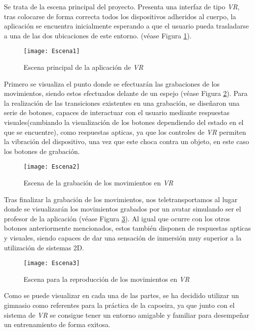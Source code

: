 Se trata de la escena principal del proyecto. Presenta una interfaz de tipo \textit{VR}, tras colocarse de forma correcta todos los dispositivos adheridos al cuerpo, la aplicación se encuentra inicialmente esperando a que el usuario pueda trasladarse a una de las dos ubicaciones de este entorno. (véase Figura \ref{fig:Escena1}). 

\begin{figure}[h!]
    \centering 
    \texttt{[image: Escena1]}
    \caption{Escena principal de la aplicación de \textit{VR}}
    \label{fig:Escena1}
\end{figure} 

Primero se visualiza el punto donde se efectuarán las grabaciones de los movimientos, siendo estos efectuados delante de un espejo (véase Figura \ref{fig:Escena2}). Para la realización de las transiciones existentes en una grabación, se diseñaron una serie de botones, capaces de interactuar con el usuario mediante respuestas visuales(cambiando la visualización de los botones dependiendo del estado en el que se encuentre), como respuestas apticas, ya que los controles de \textit{VR} permiten la vibración del dispositivo, una vez que este choca contra un objeto, en este caso los botones de grabación.

\begin{figure}[h!]
    \centering 
    \texttt{[image: Escena2]}
    \caption{Escena de la grabación de los movimientos en \textit{VR}}
    \label{fig:Escena2}
\end{figure} 

Tras finalizar la grabación de los movimientos, nos teletransportamos al lugar donde se visualizarán los movimientos grabados por un avatar simulando ser el profesor de la aplicación (véase Figura \ref{fig:Escena3}). Al igual que ocurre con los otros botones anteriormente mencionados, estos también disponen de respuestas apticas y visuales, siendo capaces de dar una sensación de inmersión muy superior a la utilización de sistemas 2D.

\begin{figure}[h!]
    \centering 
    \texttt{[image: Escena3]}
    \caption{Escena para la reproducción de los movimientos en \textit{VR}}
    \label{fig:Escena3}
\end{figure} 

Como se puede visualizar en cada una de las partes, se ha decidido utilizar un gimnasio como referentes para la práctica de la capoeira, ya que junto con el sistema de \textit{VR} se consigue tener un entorno amigable y familiar para desempeñar un entrenamiento de forma exitosa.

